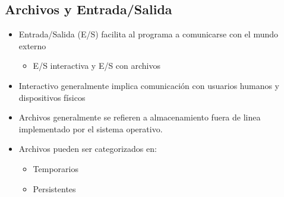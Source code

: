 \documentclass[11pt]{article}
\begin{document}
\subsection*{Archivos y Entrada/Salida}
\label{sec:orgheadline48}
\begin{itemize}
\item Entrada/Salida (E/S) facilita al programa a comunicarse con el mundo externo
\begin{itemize}
\item E/S interactiva y E/S con archivos
\end{itemize}
\item Interactivo generalmente implica comunicación con usuarios humanos y
dispositivos físicos
\item Archivos generalmente se refieren a almacenamiento fuera de linea
implementado por el sistema operativo.
\item Archivos pueden ser categorizados en:
\begin{itemize}
\item Temporarios
\item Persistentes
\end{itemize}
\end{itemize}
\end{document}
